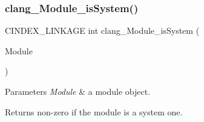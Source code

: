 \subsubsection{\texorpdfstring{clang\+\_\+\+Module\+\_\+is\+System()}{clang\_Module\_isSystem()}}
{\footnotesize\ttfamily C\+I\+N\+D\+E\+X\+\_\+\+L\+I\+N\+K\+A\+GE int clang\+\_\+\+Module\+\_\+is\+System (\begin{DoxyParamCaption}\item[{C\+X\+Module}]{Module }\end{DoxyParamCaption})}


\begin{DoxyParams}{Parameters}
{\em Module} & a module object.\\
\hline
\end{DoxyParams}
\begin{DoxyReturn}{Returns}
non-\/zero if the module is a system one. 
\end{DoxyReturn}
